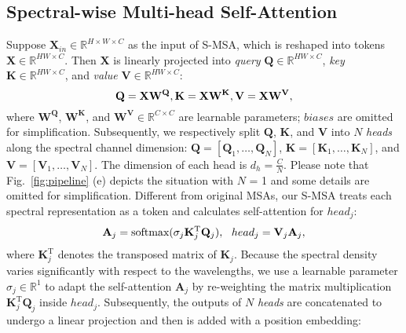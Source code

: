 \documentclass[10pt,twocolumn,letterpaper]{article}
\begin{document}
\subsection{Spectral-wise Multi-head Self-Attention}
Suppose $\mathbf{X}_{in} \in \mathbb{R}^{H\times W \times C}$ as the input of S-MSA, which is reshaped into tokens $\mathbf{X} \in \mathbb{R}^{HW \times C}$. Then $\mathbf{X}$ is linearly projected into \emph{query} $\mathbf{Q} \in \mathbb{R}^{HW \times C}$, \emph{key} $\mathbf{K} \in \mathbb{R}^{HW \times C}$, and \emph{value} $\mathbf{V} \in \mathbb{R}^{HW \times C}$: 
\vspace{0.2mm}
\begin{equation}
\mathbf{Q} = \mathbf{X}\mathbf{W}^\mathbf{Q}, \mathbf{K} = \mathbf{X}\mathbf{W}^\mathbf{K}, \mathbf{V} = \mathbf{X}\mathbf{W}^\mathbf{V},
\label{linear_proj}
\vspace{0.2mm}
\end{equation}
where $\mathbf{W}^\mathbf{Q}$, $\mathbf{W}^\mathbf{K}$, and $\mathbf{W}^\mathbf{V} \in \mathbb{R}^{C \times C}$ are learnable parameters; $biases$ are omitted for simplification. Subsequently, we respectively split $\mathbf{Q}$, $\mathbf{K}$, and $\mathbf{V}$ into $N$ \emph{heads} along the spectral channel dimension: $\mathbf{Q} = [\mathbf{Q}_1,\ldots,\mathbf{Q}_N]$, $\mathbf{K} = [\mathbf{K}_1,\ldots,\mathbf{K}_N]$, and $\mathbf{V} = [\mathbf{V}_1,\ldots,\mathbf{V}_N]$. The dimension of each head is $d_h = \frac{C}{N}$. Please note that Fig.~\ref{fig:pipeline} (e) depicts the situation with $N$ = 1 and some details are omitted for simplification. Different from original MSAs, our S-MSA treats each spectral representation as a token and calculates self-attention for $head_j$:
\vspace{-0.2mm}
\begin{equation}
\mathbf{A}_j = \text{softmax}(\sigma_j \mathbf{K}_j^\text{T} \mathbf{Q}_j), ~~{head}_j  =\mathbf{V}_j \mathbf{A}_j, 
\label{s-attention}
\vspace{-0.2mm}
\end{equation}
where $\mathbf{K}_j^\text{T}$ denotes the transposed matrix of $\mathbf{K}_j$. Because the spectral density varies significantly with respect to the wavelengths, we use a learnable parameter $\sigma_j \in \mathbb{R}^{1}$ to adapt the self-attention $\mathbf{A}_j$ by re-weighting the matrix multiplication $\mathbf{K}_j^\text{T} \mathbf{Q}_j$ inside $head_j$. Subsequently, the outputs of $N$ \emph{heads} are concatenated to undergo a linear projection and then is added with a position embedding:
\end{document}
